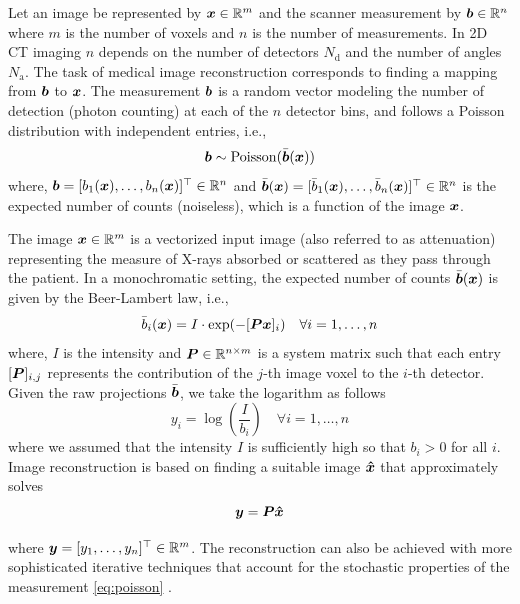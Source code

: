 Let an image be represented by $\bm{x} \in \mathbb{R}^m$ and the scanner measurement by $\bm{b} \in \mathbb{R}^n$ where $m$ is the number of voxels and $n$ is the number of measurements. In \ac{2D} \ac{CT} imaging $n$ depends on the number of detectors $N_\mathrm{d}$ and the number of angles $N_\mathrm{a}$. The task of medical image reconstruction corresponds to finding a mapping from $\bm{b}$ to $\bm{x}$. The measurement $\bm{b}$ is a random vector modeling the number of detection (photon counting) at each of the $n$ detector bins, and follows a Poisson distribution with independent entries, i.e.,
\begin{equation}\label{eq:pCT}
\bm{b} \sim \mathrm{Poisson}(\bar{\bm{b}}(\bm{x}))
\end{equation}    
where, $\bm{b}  =  [b_1(\bm{x}),\dots,b_n(\bm{x})]^\top\in \mathbb{R}^n$ and $\bar{\bm{b}}(\bm{x})  =  [\bar{b}_1(\bm{x}),\dots,\bar{b}_n(\bm{x})]^\top\in \mathbb{R}^n$ is the expected number of counts (noiseless), which is a function of the image $\bm{x}$. 

The image $\bm{x}\in\mathbb{R}^m$ is a vectorized input image (also referred to as attenuation) representing the measure of X-rays absorbed or scattered as they pass through the patient. In a monochromatic setting, the expected number of counts $\bar{\bm{b}}(\bm{x})$  is given by the Beer-Lambert law, i.e.,
\begin{equation}\label{eq:CT}
\bar{b}_i(\bm{x}) = I \cdot \exp (-[\bm{P} \bm{x}]_i) \quad \forall i=1,\dots,n 
\end{equation}
where, $I$ is the intensity and $\bm{P} \in \mathbb{R}^{n\times m}$ is a system matrix such that each entry $[\bm{P}]_{i,j}$ represents the contribution of the $j$-th image voxel to the $i$-th detector. Given the raw projections $\bar{\bm{b}}$, we take the logarithm as follows
\begin{equation}
y_i = \log\left(\frac{I}{b_i}\right) \quad \forall i=1,\dots,n   
\end{equation}
where we assumed that the intensity $I$ is sufficiently high so that $b_i>0$ for all $i$. Image reconstruction is based on finding a suitable image $\bm{\hat{x}}$ that approximately solves 
\begin{equation}\label{eq:pb2solve}
\bm{y} = \bm{P} \bm{\hat{x}} 
\end{equation} 
 
where $\bm{y}  =  [y_1,\dots,y_n]^\top\in \mathbb{R}^m$. The reconstruction can also be achieved with more sophisticated iterative techniques that account for the stochastic properties of the measurement \eqref{eq:poisson} \cite{nuyts1998iterative,Elbakri2002}.

